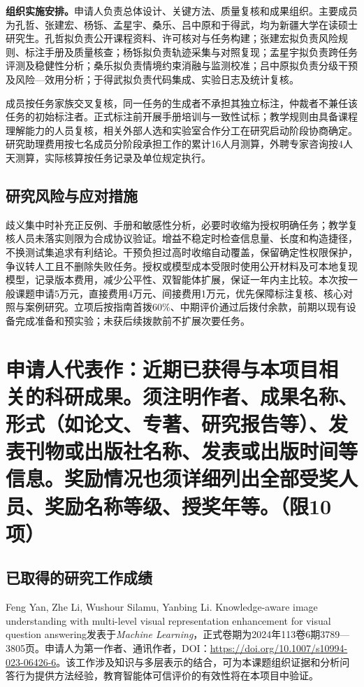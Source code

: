 \textbf{组织实施安排。}申请人负责总体设计、关键方法、质量复核和成果组织。主要成员为孔哲、张建宏、杨铄、孟星宇、桑乐、吕中原和于得武，均为新疆大学在读硕士研究生。孔哲拟负责公开课程资料、许可核对与任务构建；张建宏拟负责风险规则、标注手册及质量核查；杨铄拟负责轨迹采集与对照复现；孟星宇拟负责跨任务评测及稳健性分析；桑乐拟负责情境约束消融与监测校准；吕中原拟负责分级干预及风险—效用分析；于得武拟负责代码集成、实验日志及统计复核。

成员按任务家族交叉复核，同一任务的生成者不承担其独立标注，仲裁者不兼任该任务的初始标注者。正式标注前开展手册培训与一致性试标；教学规则由具备课程理解能力的人员复核，相关外部人选和实验室合作分工在研究启动阶段协商确定。研究助理费用按七名成员分阶段承担工作的累计16人月测算，外聘专家咨询按4人天测算，实际核算按任务记录及单位规定执行。

\subsection{研究风险与应对措施}\label{subsec:risks}
歧义集中时补充正反例、手册和敏感性分析，必要时收缩为授权明确任务；教学复核人员未落实则限为合成协议验证。增益不稳定时检查信息量、长度和构造捷径，不换测试集追求有利结论。干预负担过高时收缩自动覆盖，保留确定性权限保护，争议转人工且不删除失败任务。授权或模型成本受限时使用公开材料及可本地复现模型，记录版本费用，减少公平性、双智能体扩展，保证一年内主比较。本次按一般课题申请5万元，直接费用4万元、间接费用1万元，优先保障标注复核、核心对照与案例研究。立项后按指南首拨60\%、中期评价通过后拨付余款，前期以现有设备完成准备和预实验；未获后续拨款前不扩展次要任务。

\section{\textbf{申请人代表作}：近期已获得与本项目相关的科研成果。须注明作者、成果名称、形式（如论文、专著、研究报告等）、发表刊物或出版社名称、发表或出版时间等信息。奖励情况也须详细列出全部受奖人员、奖励名称等级、授奖年等。\textbf{（限10 项）}}

\subsection{已取得的研究工作成绩}

Feng Yan, Zhe Li, Wushour Silamu, Yanbing Li. Knowledge-aware image understanding with multi-level visual representation enhancement for visual question answering发表于\textit{Machine Learning}，正式卷期为2024年113卷6期3789—3805页\cite{yan2024knowledge}。申请人为第一作者、通讯作者，DOI：\url{https://doi.org/10.1007/s10994-023-06426-6}。该工作涉及知识与多层表示的结合，可为本课题组织证据和分析问答行为提供方法经验，教育智能体可信评价的有效性将在本项目中验证。

